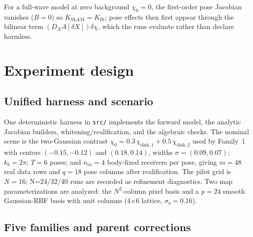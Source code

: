\documentclass[12pt]{article}
\begin{document}
For a full-wave model at zero background $\chi_0=0$, the first-order pose
Jacobian vanishes ($B=0$) so $K_{\mathrm{SLAM}}=K_{\mathrm{IS}}$; pose effects
then first appear through the bilinear term $(D_X A[\delta X])\delta\chi$,
which the runs evaluate rather than declare harmless.

\section{Experiment design}\label{sec:design}

\subsection{Unified harness and scenario}

One deterministic harness in \texttt{src/} implements the forward model, the analytic
Jacobian builders, whitening/realification, and the algebraic checks. The
nominal scene is the two-Gaussian contrast
$\chi_0=0.3\,\chi_{\mathrm{disk},1}+0.5\,\chi_{\mathrm{disk},2}$ used by
Family~1 with centers $(-0.15,-0.12)$ and $(0.18,0.14)$, widths
$\sigma=(0.09,0.07)$; $k_b=2\pi$; $T=6$ poses; and $n_{\mathrm{rx}}=4$
body-fixed receivers per pose, giving $m=48$ real data rows and $q=18$ pose
columns after realification. The pilot grid is $N=16$; N=24/32/40 runs are
recorded as refinement diagnostics. Two map parameterizations are analyzed:
the $N^2$-column pixel basis and a $p=24$ smooth Gaussian-RBF basis with unit
columns (4$\times$6 lattice, $\sigma_b=0.16$).

\subsection{Five families and parent corrections}
\end{document}
